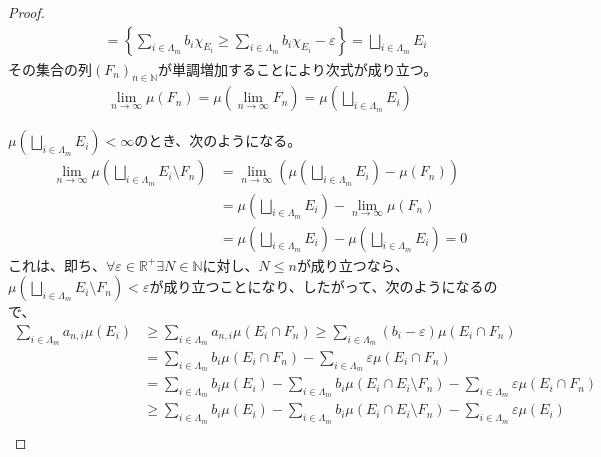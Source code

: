 \documentclass[dvipdfmx]{jsarticle}
\begin{document}
\begin{proof}
\begin{align*}
&= \left\{ \sum_{i \in \varLambda_{m}} {b_{i}\chi_{E_{i}}} \geq \sum_{i \in \varLambda_{m}} {b_{i}\chi_{E_{i}}} - \varepsilon \right\} = \bigsqcup_{i \in \varLambda_{m}} E_{i}
\end{align*}
その集合の列$\left( F_{n} \right)_{n \in \mathbb{N}}$が単調増加することにより次式が成り立つ。
\begin{align*}
\lim_{n \rightarrow \infty}{\mu\left( F_{n} \right)} = \mu\left( \lim_{n \rightarrow \infty}F_{n} \right) = \mu\left( \bigsqcup_{i \in \varLambda_{m}} E_{i} \right)
\end{align*}\par
$\mu\left( \bigsqcup_{i \in \varLambda_{m}} E_{i} \right) < \infty$のとき、次のようになる。
\begin{align*}
\lim_{n \rightarrow \infty}{\mu\left( \bigsqcup_{i \in \varLambda_{m}} E_{i} \setminus F_{n} \right)} &= \lim_{n \rightarrow \infty}\left( \mu\left( \bigsqcup_{i \in \varLambda_{m}} E_{i} \right) - \mu\left( F_{n} \right) \right)\\
&= \mu\left( \bigsqcup_{i \in \varLambda_{m}} E_{i} \right) - \lim_{n \rightarrow \infty}{\mu\left( F_{n} \right)}\\
&= \mu\left( \bigsqcup_{i \in \varLambda_{m}} E_{i} \right) - \mu\left( \bigsqcup_{i \in \varLambda_{m}} E_{i} \right) = 0
\end{align*}
これは、即ち、$\forall\varepsilon \in \mathbb{R}^{+}\exists N \in \mathbb{N}$に対し、$N \leq n$が成り立つなら、$\mu\left( \bigsqcup_{i \in \varLambda_{m}} E_{i} \setminus F_{n} \right) < \varepsilon$が成り立つことになり、したがって、次のようになるので、
\begin{align*}
\sum_{i \in \varLambda_{m}} {a_{n,i}\mu\left( E_{i} \right)} &\geq \sum_{i \in \varLambda_{m}} {a_{n,i}\mu\left( E_{i} \cap F_{n} \right)} \geq \sum_{i \in \varLambda_{m}} {\left( b_{i} - \varepsilon \right)\mu\left( E_{i} \cap F_{n} \right)}\\
&= \sum_{i \in \varLambda_{m}} {b_{i}\mu\left( E_{i} \cap F_{n} \right)} - \sum_{i \in \varLambda_{m}} {\varepsilon\mu\left( E_{i} \cap F_{n} \right)}\\
&= \sum_{i \in \varLambda_{m}} {b_{i}\mu\left( E_{i} \right)} - \sum_{i \in \varLambda_{m}} {b_{i}\mu\left( E_{i} \cap E_{i} \setminus F_{n} \right)} - \sum_{i \in \varLambda_{m}} {\varepsilon\mu\left( E_{i} \cap F_{n} \right)}\\
&\geq \sum_{i \in \varLambda_{m}} {b_{i}\mu\left( E_{i} \right)} - \sum_{i \in \varLambda_{m}} {b_{i}\mu\left( E_{i} \cap E_{i} \setminus F_{n} \right)} - \sum_{i \in \varLambda_{m}} {\varepsilon\mu\left( E_{i} \right)}\\

\end{align*}
\end{proof}
\end{document}
